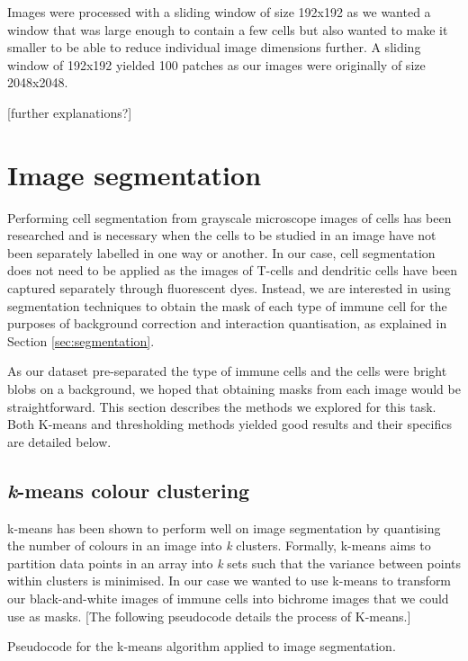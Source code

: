 Images were processed with a sliding window of size 192x192 as we wanted a window that was large enough to contain a few cells but also wanted to make it smaller to be able to reduce individual image dimensions further. A sliding window of 192x192 yielded 100 patches as our images were originally of size 2048x2048.

[further explanations?]

\section{Image segmentation}

Performing cell segmentation from grayscale microscope images of cells has been researched and is necessary when the cells to be studied in an image have not been separately labelled in one way or another. In our case, cell segmentation does not need to be applied as the images of T-cells and dendritic cells have been captured separately through fluorescent dyes. Instead, we are interested in using segmentation techniques to obtain the mask of each type of immune cell for the purposes of background correction and interaction quantisation, as explained in Section \ref{sec:segmentation}.

As our dataset pre-separated the type of immune cells and the cells were bright blobs on a background, we hoped that obtaining masks from each image would be straightforward. This section describes the methods we explored for this task. Both K-means and thresholding methods yielded good results and their specifics are detailed below.

\subsection{\textit{k}-means colour clustering}

k-means has been shown to perform well on image segmentation by quantising the number of colours in an image into \textit{k} clusters. Formally, k-means aims to partition data points in an array into \textit{k} sets such that the variance between points within clusters is minimised. In our case we wanted to use k-means to transform our black-and-white images of immune cells into bichrome images that we could use as masks. [The following pseudocode details the process of K-means.]

\begin{algorithm}[h]
    \DontPrintSemicolon

\caption{Pseudocode for the k-means algorithm applied to image segmentation.}
\label{alg:kmeans}
\end{algorithm}

